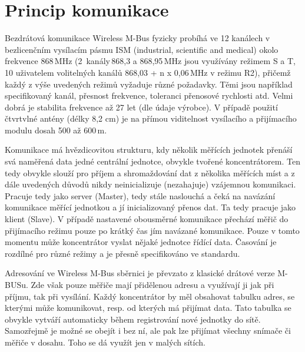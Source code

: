 
\section{Princip komunikace}

Bezdrátová komunikace Wireless M-Bus fyzicky probíhá ve 12 kanálech v bezlicenčním vysílacím pásmu ISM (industrial, scientific and medical) okolo frekvence 868\,MHz (2~kanály\,868,3 a 868,95\,MHz jsou využívány režimem S a T, 10 uživatelem volitelných kanálů 868,03 + n x 0,06\,MHz v režimu R2), přičemž každý z výše uvedených režimů vyžaduje různé požadavky. Těmi jsou například specifikovaný kanál, přesnost frekvence, toleranci přenosové rychlosti atd. Velmi dobrá je stabilita frekvence až 27 let (dle údaje výrobce). V případě použití čtvrtvlné antény (délky 8,2 cm) je na přímou viditelnost vysílacího a přijímacího modulu dosah 500 až 600\,m.

Komunikace má hvězdicovitou strukturu, kdy několik měřících jednotek přenáší svá naměřená data jedné centrální jednotce, obvykle tvořené koncentrátorem. Ten tedy obvykle slouží pro příjem a shromaždování dat z několika měřících míst a z dále uvedených důvodů nikdy neinicializuje (nezahajuje) vzájemnou komunikaci. Pracuje tedy jako server (Master), tedy stále naslouchá a čeká na navázání komunikace měřící jednotkou a jí inicializovaný přenos dat. Ta tedy pracuje jako klient (Slave). V případě nastavené obousměrné komunikace přechází měřič do přijímacího režimu pouze po krátký čas jím navázané komunikace. Pouze v tomto momentu může koncentrátor vyslat nějaké jednotce řídící data. Časování je rozdílné pro různé režimy a je přesně specifikováno ve standardu.

Adresování ve Wireless M-Bus sběrnici je převzato z klasické drátové verze M-BUSu. Zde však pouze měřiče mají přidělenou adresu a využívají ji jak při příjmu, tak při vysílání. Každý koncentrátor by měl obsahovat tabulku adres, se kterými může komunikovat, resp. od kterých má přijímat data. Tato tabulka se obvykle vytváří automaticky během registrování nové jednotky do sítě. Samozřejmě je možné se obejít i bez ní, ale pak lze přijímat všechny snímače či měřiče v dosahu. Toho se dá využít jen v malých sítích. 


